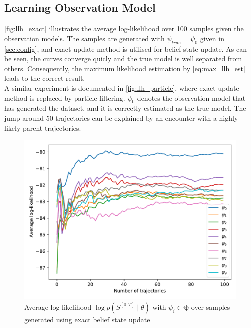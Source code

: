 \subsection{Learning Observation Model}
\autoref{fig:llh_exact} illustrates the average log-likelihood over 100 samples given the observation models. The samples are generated with $ \psi_{true} = \psi_0 $ given in \cref{sec:config}, and exact update method is utilised for belief state update. As can be seen, the curves converge quicly and the true model is well separated from others. Consequently, the maximum likelihood estimation by \autoref{eq:max_llh_est} leads to the correct result. \\
A similar experiment is documented in \autoref{fig:llh_particle}, where exact update method is replaced by particle filtering. $ \psi_0 $ denotes the observation model that has generated the dataset, and it is correctly estimated as the true model. The jump around 50 trajectories can be explained by an encounter with a highly likely parent trajectories.
\begin{figure}[H]
	\begin{center}
		\includegraphics[width=.75\textwidth]{figures/roc_analysis/roc_exactUpdate/llh_exactUpdate_psi_0}
		\caption{Average log-likelihood $ \log p(S^{[0,T]} \mid \theta) $ with $ \psi_i \in \symbf{\psi} $ over samples generated using exact belief state update}
		\label{fig:llh_exact}
	\end{center}
\end{figure}
